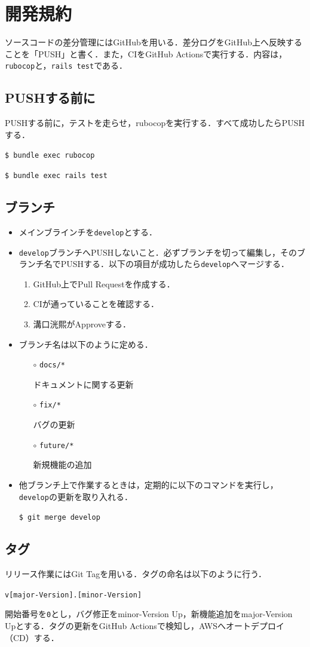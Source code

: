 \section{開発規約}\label{q3.3}
ソースコードの差分管理にはGitHubを用いる．差分ログをGitHub上へ反映することを「PUSH」と書く．また，CIをGitHub Actionsで実行する．内容は，\texttt{rubocop}と，\texttt{rails test}である．
\subsection{PUSHする前に}\label{q3.3.1}
PUSHする前に，テストを走らせ，rubocopを実行する．すべて成功したらPUSHする．
\begin{screen}
    \texttt{\$ bundle exec rubocop}
    
    \texttt{\$ bundle exec rails test}
\end{screen}

\subsection{ブランチ}\label{q3.3.2}
\begin{itemize}
    \item メインブラインチを\texttt{develop}とする．
    
    \item \texttt{develop}ブランチへPUSHしないこと．必ずブランチを切って編集し，そのブランチ名でPUSHする．以下の項目が成功したら\texttt{develop}へマージする．
    \begin{enumerate}
        \item GitHub上でPull Requestを作成する．
        \item CIが通っていることを確認する．
        \item 溝口洸熙がApproveする．
    \end{enumerate}
    
    \item ブランチ名は以下のように定める．
    \begin{itemize}
        \item[$\circ$] \texttt{docs/*}

        ドキュメントに関する更新
        \item[$\circ$] \texttt{fix/*}

        バグの更新
        \item[$\circ$] \texttt{future/*}

        新規機能の追加
    \end{itemize}
    
    \item 他ブランチ上で作業するときは，定期的に以下のコマンドを実行し，\texttt{develop}の更新を取り入れる．
    \begin{screen}
        \texttt{\$ git merge develop}
    \end{screen}
\end{itemize}

\subsection{タグ}\label{q3.3.3}
リリース作業にはGit Tagを用いる．タグの命名は以下のように行う．
\begin{screen}
    \texttt{v[major-Version].[minor-Version]}
\end{screen}

開始番号を\texttt{0}とし，バグ修正をminor-Version Up，新機能追加をmajor-Version Upとする．タグの更新をGitHub Actionsで検知し，AWSへオートデプロイ（CD）する．

